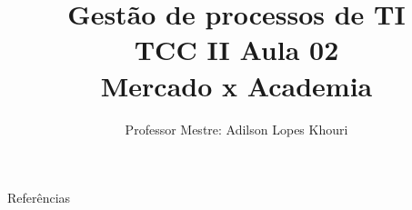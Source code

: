 \documentclass[compress, hyperref={pdfpagelayout=SinglePage}]{beamer}
\title[TCC II - Aula 02]{Gestão de processos de TI \\ TCC II Aula 02 \\ Mercado x Academia}
\author{Professor Mestre: Adilson Lopes Khouri}
\begin{document}
	\begin{frame}
		\titlepage
	\end{frame}
	
	
	
	
	
	
	
	
	
	
					
	

	
	

	\begin{frame}[allowframebreaks]{}
		\begin{block}{Referências}
			\tiny
			\nocite{*}
			
	    		
	    	\end{block}
	\end{frame}
\end{document}
